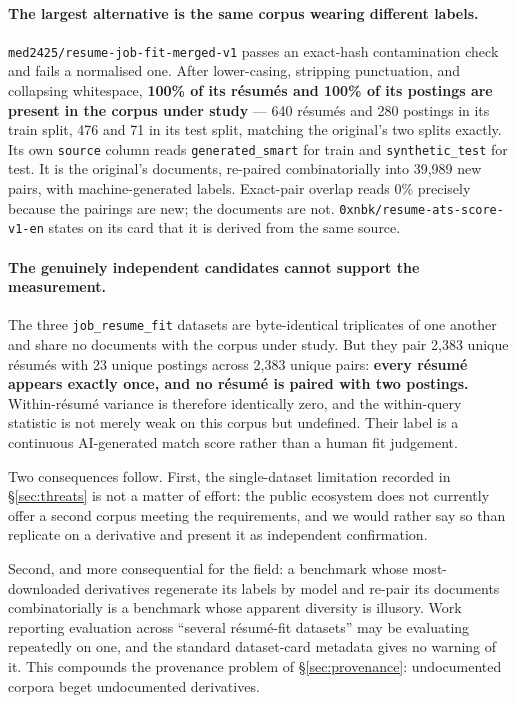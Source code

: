 \documentclass[11pt]{article}                      %
\begin{document}
\paragraph{The largest alternative is the same corpus wearing different labels.}
\texttt{med2425/resume-job-fit-merged-v1} passes an exact-hash contamination
check and fails a normalised one. After lower-casing, stripping punctuation, and
collapsing whitespace, \textbf{100\% of its résumés and 100\% of its postings are
present in the corpus under study} --- 640 résumés and 280 postings in its train
split, 476 and 71 in its test split, matching the original's two splits exactly.
Its own \texttt{source} column reads \texttt{generated\_smart} for train and
\texttt{synthetic\_test} for test. It is the original's documents, re-paired
combinatorially into 39{,}989 new pairs, with machine-generated labels.
Exact-pair overlap reads 0\% precisely because the pairings are new; the
documents are not. \texttt{0xnbk/resume-ats-score-v1-en} states on its card that
it is derived from the same source.

\paragraph{The genuinely independent candidates cannot support the measurement.}
The three \texttt{job\_resume\_fit} datasets are byte-identical triplicates of one
another and share no documents with the corpus under study. But they pair 2{,}383
unique résumés with 23 unique postings across 2{,}383 unique pairs:
\textbf{every résumé appears exactly once, and no résumé is paired with two
postings.} Within-résumé variance is therefore identically zero, and the
within-query statistic is not merely weak on this corpus but undefined. Their
label is a continuous AI-generated match score rather than a human fit judgement.

Two consequences follow. First, the single-dataset limitation recorded in
\S\ref{sec:threats} is not a matter of effort: the public ecosystem does not
currently offer a second corpus meeting the requirements, and we would rather say
so than replicate on a derivative and present it as independent confirmation.

Second, and more consequential for the field: a benchmark whose most-downloaded
derivatives regenerate its labels by model and re-pair its documents
combinatorially is a benchmark whose apparent diversity is illusory. Work
reporting evaluation across ``several résumé-fit datasets'' may be evaluating
repeatedly on one, and the standard dataset-card metadata gives no warning of it.
This compounds the provenance problem of \S\ref{sec:provenance}: undocumented
corpora beget undocumented derivatives.
\end{document}
